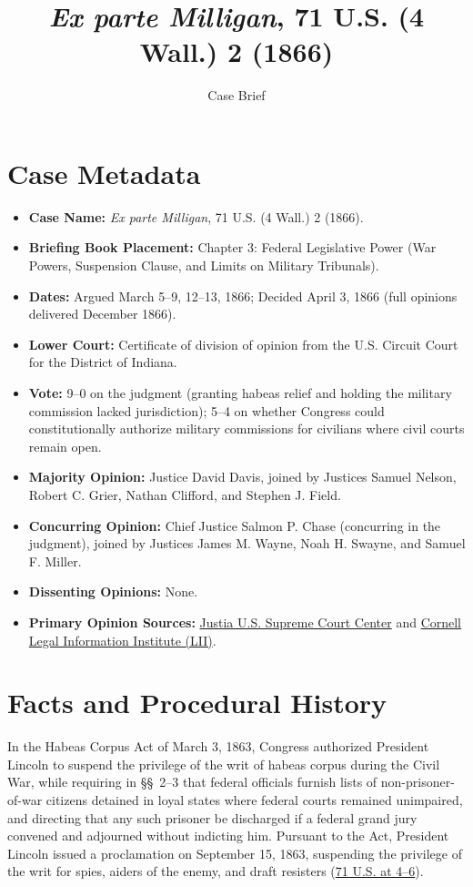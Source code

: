 \documentclass[12pt]{article}
\title{\textit{Ex parte Milligan}, 71 U.S. (4 Wall.) 2 (1866)}
\author{Case Brief}
\date{}
\begin{document}
\maketitle

\section{Case Metadata}

\begin{itemize}
  \item \textbf{Case Name:} \textit{Ex parte Milligan}, 71 U.S. (4 Wall.) 2 (1866).
  \item \textbf{Briefing Book Placement:} Chapter 3: Federal Legislative Power (War Powers, Suspension Clause, and Limits on Military Tribunals).
  \item \textbf{Dates:} Argued March 5--9, 12--13, 1866; Decided April 3, 1866 (full opinions delivered December 1866).
  \item \textbf{Lower Court:} Certificate of division of opinion from the U.S. Circuit Court for the District of Indiana.
  \item \textbf{Vote:} 9--0 on the judgment (granting habeas relief and holding the military commission lacked jurisdiction); 5--4 on whether Congress could constitutionally authorize military commissions for civilians where civil courts remain open.
  \item \textbf{Majority Opinion:} Justice David Davis, joined by Justices Samuel Nelson, Robert C. Grier, Nathan Clifford, and Stephen J. Field.
  \item \textbf{Concurring Opinion:} Chief Justice Salmon P. Chase (concurring in the judgment), joined by Justices James M. Wayne, Noah H. Swayne, and Samuel F. Miller.
  \item \textbf{Dissenting Opinions:} None.
  \item \textbf{Primary Opinion Sources:} \href{https://supreme.justia.com/cases/federal/us/71/2/}{Justia U.S. Supreme Court Center} and \href{https://www.law.cornell.edu/supremecourt/text/71/2}{Cornell Legal Information Institute (LII)}.
\end{itemize}

\section{Facts and Procedural History}

In the Habeas Corpus Act of March 3, 1863, Congress authorized President Lincoln to suspend the privilege of the writ of habeas corpus during the Civil War, while requiring in \S\S~2--3 that federal officials furnish lists of non-prisoner-of-war citizens detained in loyal states where federal courts remained unimpaired, and directing that any such prisoner be discharged if a federal grand jury convened and adjourned without indicting him. Pursuant to the Act, President Lincoln issued a proclamation on September 15, 1863, suspending the privilege of the writ for spies, aiders of the enemy, and draft resisters (\href{https://supreme.justia.com/cases/federal/us/71/2/}{71 U.S. at 4--6}).
\end{document}
